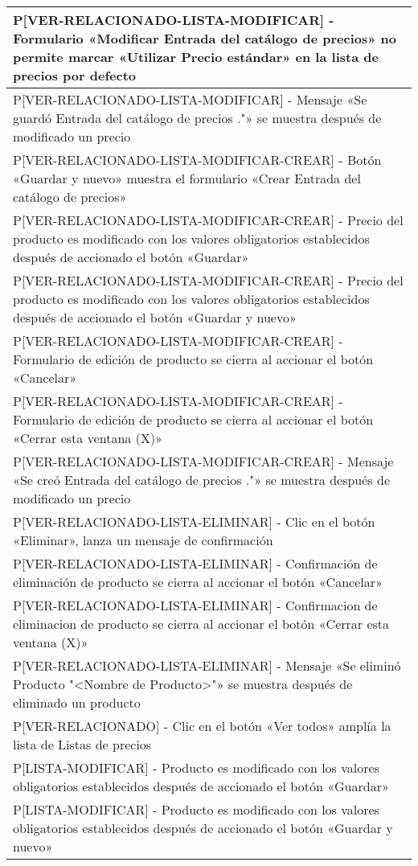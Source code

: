 \begin{longtable}{|p{15.0cm}|}
P[VER-RELACIONADO-LISTA-MODIFICAR] - Formulario «Modificar Entrada del catálogo de precios» no permite marcar «Utilizar Precio estándar» en la lista de precios por defecto \\ \hline
P[VER-RELACIONADO-LISTA-MODIFICAR] - Mensaje «Se guardó Entrada del catálogo de precios ."» se muestra después de modificado un precio \\ \hline
P[VER-RELACIONADO-LISTA-MODIFICAR-CREAR] - Botón «Guardar y nuevo» muestra el formulario «Crear Entrada del catálogo de precios» \\ \hline
P[VER-RELACIONADO-LISTA-MODIFICAR-CREAR] - Precio del producto es modificado con los valores obligatorios establecidos después de accionado el botón «Guardar» \\ \hline
P[VER-RELACIONADO-LISTA-MODIFICAR-CREAR] - Precio del producto es modificado con los valores obligatorios establecidos después de accionado el botón «Guardar y nuevo» \\ \hline
P[VER-RELACIONADO-LISTA-MODIFICAR-CREAR] - Formulario de edición de producto se cierra al accionar el botón «Cancelar» \\ \hline
P[VER-RELACIONADO-LISTA-MODIFICAR-CREAR] - Formulario de edición de producto se cierra al accionar el botón «Cerrar esta ventana (X)» \\ \hline
P[VER-RELACIONADO-LISTA-MODIFICAR-CREAR] - Mensaje «Se creó Entrada del catálogo de precios ."» se muestra después de modificado un precio \\ \hline
P[VER-RELACIONADO-LISTA-ELIMINAR] - Clic en el botón «Eliminar», lanza un mensaje de confirmación \\ \hline
P[VER-RELACIONADO-LISTA-ELIMINAR] - Confirmación de eliminación de producto se cierra al accionar el botón «Cancelar» \\ \hline
P[VER-RELACIONADO-LISTA-ELIMINAR] - Confirmacion de eliminacion de producto se cierra al accionar el botón «Cerrar esta ventana (X)» \\ \hline
P[VER-RELACIONADO-LISTA-ELIMINAR] - Mensaje «Se eliminó Producto "<Nombre de Producto>"» se muestra después de eliminado un producto \\ \hline
P[VER-RELACIONADO] - Clic en el botón «Ver todos» amplía la lista de Listas de precios \\ \hline
P[LISTA-MODIFICAR] - Producto es modificado con los valores obligatorios establecidos después de accionado el botón «Guardar» \\ \hline
P[LISTA-MODIFICAR] - Producto es modificado con los valores obligatorios establecidos después de accionado el botón «Guardar y nuevo» \\ \hline

\end{longtable}
